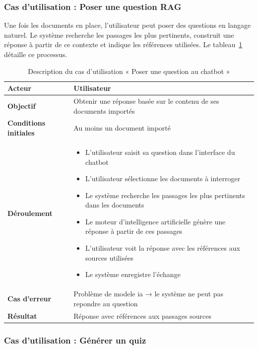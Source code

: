 \subsubsection{Cas d'utilisation : Poser une question RAG}

Une fois les documents en place, l'utilisateur peut poser des questions en langage naturel. Le système recherche les passages les plus pertinents, construit une réponse à partir de ce contexte et indique les références utilisées. Le tableau~\ref{tab:uc_rag_chat} détaille ce processus.

\begin{table}[H]
\centering
\renewcommand{\arraystretch}{1.2}
\begin{tabular}{|p{4cm}|p{10cm}|}
\hline
\textbf{Acteur} & Utilisateur \\ \hline
\textbf{Objectif} & Obtenir une réponse basée sur le contenu de ses documents importés \\ \hline
\textbf{Conditions initiales} & Au moins un document importé \\ \hline
\textbf{Déroulement} &
\begin{itemize}
    \item L'utilisateur saisit sa question dans l'interface du chatbot
    \item L'utilisateur sélectionne les documents à interroger
    \item Le système recherche les passages les plus pertinents dans les documents
    \item Le moteur d'intelligence artificielle génère une réponse à partir de ces passages
    \item L'utilisateur voit la réponse avec les références aux sources utilisées
    \item Le système enregistre l'échange
\end{itemize} \\ \hline
\textbf{Cas d'erreur} & Problème de modele ia → le système ne peut pas repondre
                        au question \\ \hline
\textbf{Résultat} & Réponse avec références aux passages sources \\ \hline
\end{tabular}
\caption{Description du cas d'utilisation « Poser une question au chatbot »}
\label{tab:uc_rag_chat}
\end{table}

\subsubsection{Cas d'utilisation : Générer un quiz}

